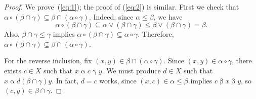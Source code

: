 \documentclass[11pt,reqno]{amsart}
\theoremstyle{plain}
\theoremstyle{definition}
\theoremstyle{remark}
\newcommand{\<}{\ensuremath{\langle}}
\renewcommand{\>}{\ensuremath{\rangle}}
\newcommand{\rel}[1]{\ensuremath{\mathbin{#1}}}
\renewcommand{\leq}{\ensuremath{\leqslant}}
\newcommand{\join}{\ensuremath{\vee}}
\begin{document}
\begin{proof}
We prove~(\ref{eq:1}); the proof of (\ref{eq:2}) is similar.  
First we check that
$\alpha \circ (\beta \cap \gamma) \subseteq \beta \cap (\alpha \circ \gamma)$. 
Indeed, since $\alpha\leq \beta$, we have
\[
\alpha \circ (\beta \cap \gamma) \subseteq \alpha \join (\beta \cap \gamma) \leq
\beta \join (\beta \cap \gamma) = \beta.
\]
Also, $\beta\cap \gamma \leq \gamma$ implies 
$\alpha \circ (\beta \cap \gamma) \subseteq
\alpha \circ \gamma$.  Therefore, 
 $\alpha \circ (\beta \cap \gamma) \subseteq \beta \cap (\alpha \circ \gamma)$. 

For the reverse inclusion, fix $(x,y) \in \beta \cap (\alpha\circ \gamma)$.
Since $(x,y) \in \alpha\circ \gamma$, there exists $c\in X$ such that $x\rel{\alpha} c
\rel{\gamma} y$.  We must produce $d\in X$ such that 
$x \rel{\alpha} d \rel{(\beta\cap \gamma)} y$.  
In fact, $d = c$ works, since %
$(x,c) \in \alpha \leq \beta$ implies $c \rel{\beta} x \rel{\beta} y$, so $(c,y) \in
\beta\cap \gamma$. 
\end{proof}
\end{document}
